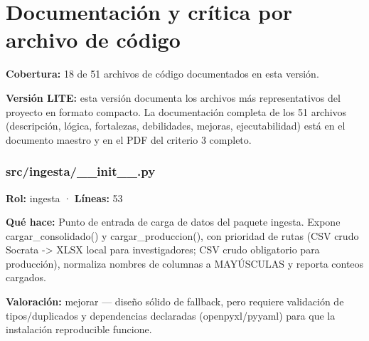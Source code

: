 \section{Documentación y crítica por archivo de código}
\noindent \textbf{Cobertura:} 18 de 51 archivos de código documentados en esta versión.

\begin{tcolorbox}[nota]\textbf{Versión LITE:} esta versión documenta los archivos más representativos del proyecto en formato compacto. La documentación completa de los 51 archivos (descripción, lógica, fortalezas, debilidades, mejoras, ejecutabilidad) está en el documento maestro y en el PDF del criterio 3 completo.\end{tcolorbox}

\subsubsection{src/ingesta/\_\_init\_\_.py}
\textbf{Rol:} ingesta · \textbf{Líneas:} 53

\textbf{Qué hace:} Punto de entrada de carga de datos del paquete ingesta. Expone cargar\_consolidado() y cargar\_produccion(), con prioridad de rutas (CSV crudo Socrata -> XLSX local para investigadores; CSV crudo obligatorio para producción), normaliza nombres de columnas a MAYÚSCULAS y reporta conteos cargados.

\textbf{Valoración:} mejorar --- diseño sólido de fallback, pero requiere validación de tipos/duplicados y dependencias declaradas (openpyxl/pyyaml) para que la instalación reproducible funcione.

